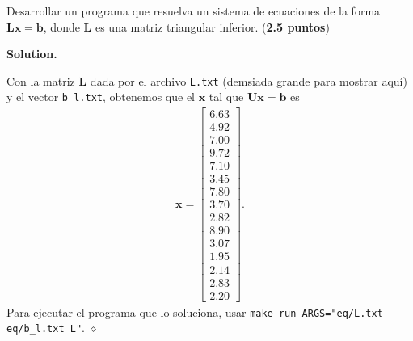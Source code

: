 \documentclass{article}
\theoremstyle{problemstyle}
\newenvironment{solution}{%
  \begin{mdframed}[linewidth=0.8pt,linecolor=Gray,backgroundcolor=Gray!5,roundcorner=5pt]%
  \noindent\textbf{Solution.}%
}{%
\hfill $ \diamond $ 
  \end{mdframed}%
}
\begin{document}
\begin{problem}
Desarrollar un programa que resuelva un sistema de ecuaciones de la forma $\mathbf{Lx} = \mathbf{b}$, donde $ \mathbf{L} $ es una matriz triangular inferior. (\textbf{2.5 puntos})
\end{problem}

\begin{solution}
	Con la matriz $ \mathbf{L} $ dada por el archivo \texttt{L.txt} (demsiada grande para mostrar aqu\'i) y el vector \texttt{b\_l.txt}, obtenemos que el $ \mathbf{x} $ tal que $ \mathbf{Ux} = \mathbf{b} $ es
	\begin{align*}
		\mathbf{x} =
		\begin{bmatrix}
			6.63 \\ 4.92 \\ 7.00 \\ 9.72 \\ 7.10 \\ 3.45 \\ 7.80 \\ 3.70 \\ 2.82 \\ 8.90 \\ 3.07 \\ 1.95 \\ 2.14 \\ 2.83 \\ 2.20
		\end{bmatrix}.
	\end{align*}
	Para ejecutar el programa que lo soluciona, usar \texttt{make run ARGS="eq/L.txt eq/b\_l.txt L"}.
\end{solution}
\end{document}
